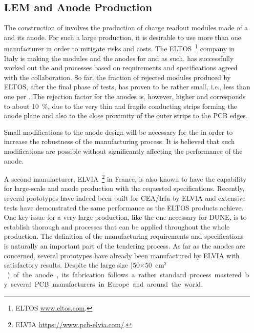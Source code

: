 \subsection{LEM and Anode Production}
\label{sec:fddp-crp-LASprod}


The construction of %
 involves the production of \dpnumswch charge readout modules made of a  and its anode. For such a large production, it is desirable to use more than one manufacturer in order to mitigate risks and costs. The ELTOS~\footnote{ ELTOS\texttrademark{} \url{www.eltos.com}.} company in Italy is making the  modules and the anodes for   and as such, has successfully worked out the  and  processes based on requirements and specifications agreed with the  collaboration. So far, the fraction of rejected  modules produced by ELTOS, after the final phase of tests, has proven to be rather small, i.e., less than one  per . The rejection factor for the anodes is, however, higher and corresponds to about \SI{10}{\%}, due to the very thin and fragile conducting strips forming the anode plane and also to the close proximity of the outer strips to the PCB edges. 


Small modifications to the anode design will be necessary for the  in order to increase the robustness of the manufacturing process. It is believed that such modifications are possible without  %
significantly affecting the performance of the anode.   

A second manufacturer, ELVIA~\footnote{ ELVIA\texttrademark{} \url{https://www.pcb-elvia.com/}.} in France, is also known to have the capability for large-scale  and anode production with the requested specifications. Recently, several  prototypes have indeed been built for CEA/Irfu 
by ELVIA and extensive tests have %
demonstrated the same   performance as the ELTOS products achieve.
 One key issue for a very large production, like the one necessary for DUNE, is to establish thorough  and  processes that can be applied throughout the whole  production. The definition of the  manufacturing requirements and specifications is naturally an important part of the tendering process. As far as the anodes are concerned, several prototypes have already been manufactured by ELVIA with satisfactory results. Despite the large size (\num{50}$\times$\SI{50}{cm$^2$}) of the anode, its fabrication follows a rather standard process mastered by several PCB manufacturers in Europe and around the world.     

